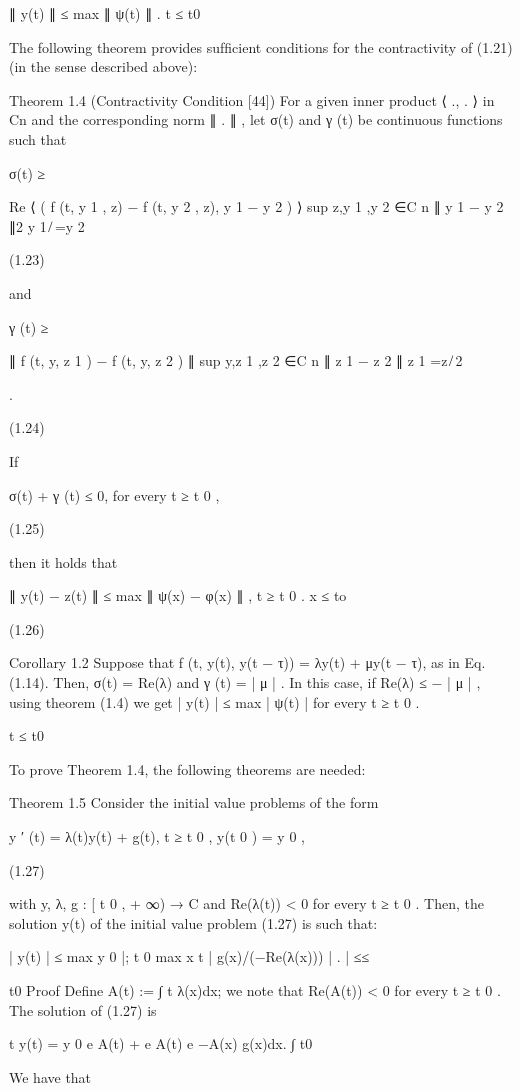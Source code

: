 \documentclass[12pt]{article}
\begin{document}
∥ y(t) ∥ ≤ max ∥ ψ(t) ∥ . t ≤ t0 

The following theorem provides sufﬁcient conditions for the contractivity of (1.21) (in the sense described above):

Theorem 1.4 (Contractivity Condition [44]) For a given inner product ⟨ ., . ⟩ in Cn  and the corresponding norm ∥ . ∥ , let σ(t) and γ (t) 
be continuous functions such that

σ(t) ≥

Re ⟨ ( f (t, y 1 , z) − f (t, y 2 , z), y 1 − y 2 ) ⟩ sup z,y 1 ,y 2 ∈C n ∥ y 1 − y 2 ∥2  y 1 ̸ =y 2

(1.23)

and

γ (t) ≥

∥ f (t, y, z 1 ) − f (t, y, z 2 ) ∥ sup y,z 1 ,z 2 ∈C n ∥ z 1 − z 2 ∥ z 1 =z ̸ 2

.

(1.24)

If

σ(t) + γ (t) ≤ 0, for every t ≥ t 0 ,

(1.25)

then it holds that

∥ y(t) − z(t) ∥ ≤ max ∥ ψ(x) − φ(x) ∥ , t ≥ t 0 . x ≤ to 

(1.26)

Corollary 1.2 Suppose that f (t, y(t), y(t − τ)) = λy(t) + μy(t − τ), as in Eq. (1.14). Then, σ(t) = Re(λ) and γ (t) = | μ | . In this 
case, if Re(λ) ≤ − | μ | , using theorem (1.4) we get | y(t) | ≤ max | ψ(t) | for every t ≥ t 0 .

t ≤ t0 

To prove Theorem 1.4, the following theorems are needed:

Theorem 1.5 Consider the initial value problems of the form

y ′ (t) = λ(t)y(t) + g(t), t ≥ t 0 , y(t 0 ) = y 0 ,

(1.27)

with y, λ, g : [ t 0 , + ∞) → C and Re(λ(t)) < 0 for every t ≥ t 0 . Then, the solution y(t) of the initial value problem (1.27) is such 
that:

| y(t) | ≤ max y 0 |; t 0 max x t | g(x)/(−Re(λ(x))) | . | { ≤≤ }

t0  Proof Deﬁne A(t) := ∫ t λ(x)dx; we note that Re(A(t)) < 0 for every t ≥ t 0 . The solution of (1.27) is

t y(t) = y 0 e A(t) + e A(t) e −A(x) g(x)dx. ∫ t0 

We have that
\end{document}
